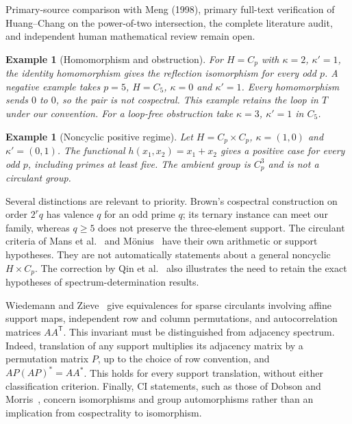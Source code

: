 \documentclass[11pt]{article}
\newtheorem{example}[theorem]{Example}
\theoremstyle{remark}\newtheorem{remark}[theorem]{Remark}
\begin{document}
Primary-source comparison with Meng (1998), primary full-text verification of Huang--Chang on the power-of-two intersection, the complete literature audit, and independent human mathematical review remain open.

\begin{example}[Homomorphism and obstruction]
For $H=C_p$ with $\kappa=2$, $\kappa'=1$, the identity homomorphism gives the reflection isomorphism for every odd $p$. A negative example takes $p=5$, $H=C_5$, $\kappa=0$ and $\kappa'=1$. Every homomorphism sends $0$ to $0$, so the pair is not cospectral. This example retains the loop in $T$ under our convention. For a loop-free obstruction take $\kappa=3$, $\kappa'=1$ in $C_5$.
\end{example}

\begin{example}[Noncyclic positive regime]
Let $H=C_p\times C_p$, $\kappa=(1,0)$ and $\kappa'=(0,1)$. The functional $h(x_1,x_2)=x_1+x_2$ gives a positive case for every odd $p$, including primes at least five. The ambient group is $C_p^3$ and is not a circulant group.
\end{example}

Several distinctions are relevant to priority. Brown's cospectral construction on order $2^r q$ has valence $q$ for an odd prime $q$; its ternary instance can meet our family, whereas $q\geq5$ does not preserve the three-element support. The circulant criteria of Mans et al.~\cite{MPS} and M\"onius~\cite{Moenius} have their own arithmetic or support hypotheses. They are not automatically statements about a general noncyclic $H\times C_p$. The correction by Qin et al.~\cite{Qin} also illustrates the need to retain the exact hypotheses of spectrum-determination results.

Wiedemann and Zieve~\cite[Theorem~1.1]{WZ} give equivalences for sparse circulants involving affine support maps, independent row and column permutations, and autocorrelation matrices $AA^{\mathsf T}$. This invariant must be distinguished from adjacency spectrum. Indeed, translation of any support multiplies its adjacency matrix by a permutation matrix $P$, up to the choice of row convention, and $AP(AP)^*=AA^*$. This holds for every support translation, without either classification criterion. Finally, CI statements, such as those of Dobson and Morris~\cite{DM}, concern isomorphisms and group automorphisms rather than an implication from cospectrality to isomorphism.
\end{document}

